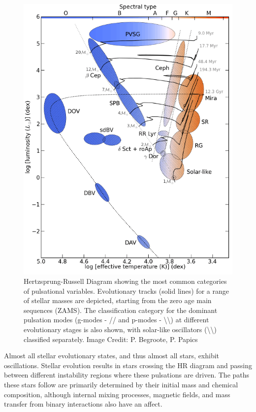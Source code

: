 \begin{figure}[htbp]
    \centering
    \includegraphics[width=0.88\linewidth]{Chapter1/HR_pulsational.png}
    \caption[Pulsational Hertzsprung-Russell Diagram]{Hertzsprung-Russell Diagram showing the most common categories of pulsational variables. Evolutionary tracks (solid lines) for a range of stellar masses are depicted, starting from the zero age main sequences (ZAMS). The classification category for the dominant pulsation modes (g-modes - // and p-modes - \textbackslash\textbackslash) at different evolutionary stages is also shown, with solar-like oscillators (\textbackslash\textbackslash) classified separately. Image Credit: P. Begroote, P. Papics}
    \label{fig:HRdiag}
\end{figure}

Almost all stellar evolutionary states, and thus almost all stars, exhibit oscillations. Stellar evolution results in stars crossing the HR diagram and passing between different instability regions where these pulsations are driven. The paths these stars follow are primarily determined by their initial mass and chemical composition, although internal mixing processes, magnetic fields, and mass transfer from binary interactions also have an affect. 

